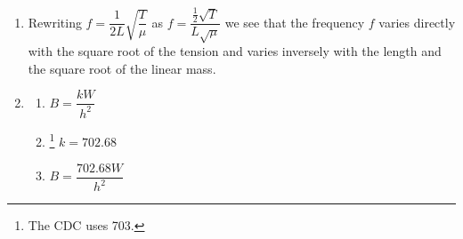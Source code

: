 \begin{enumerate}
\setcounter{enumi}{\value{HW}}

\item Rewriting $f = \dfrac{1}{2L} \sqrt{\dfrac{T}{\mu}}$ as $f = \dfrac{\frac{1}{2} \sqrt{T}}{L \sqrt{\mu}}$ we see that the frequency $f$ varies directly with the square root of the tension and varies inversely with the length and the square root of the linear mass.

\item \begin{multicols}{3} 
\begin{enumerate}
\item $B = \dfrac{kW}{h^{2}}$
\item \hspace{-.1in} \footnote{The CDC uses 703.} $k = 702.68$ 
\item $B = \dfrac{702.68W}{h^{2}}$
\end{enumerate}
\end{multicols}

\end{enumerate}